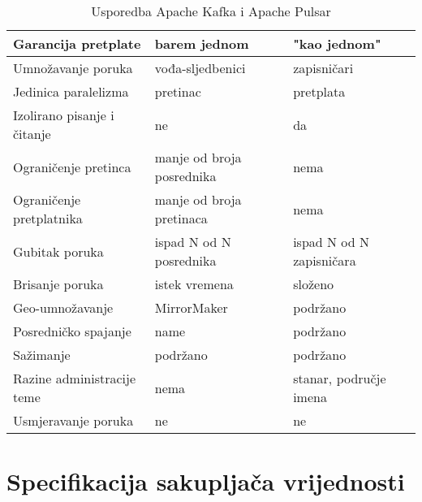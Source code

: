 \documentclass[utf8, diplomski, lmodern, numeric]{fer}
\begin{document}
\begin{table}[H]
\begin{adjustwidth}{-15mm}{15mm}
\begin{tabular}{|l|l|l|}
Garancija pretplate         & barem jednom                  & "kao jednom"                                   \\ \hline
Umnožavanje poruka          & vođa-sljedbenici              & zapisničari                                    \\ \hline
Jedinica paralelizma        & pretinac                      & pretplata                                      \\ \hline
Izolirano pisanje i čitanje & ne                            & da                                             \\ \hline
Ograničenje pretinca        & manje od broja posrednika     & nema                                           \\ \hline
Ograničenje pretplatnika    & manje od broja pretinaca      & nema                                           \\ \hline
Gubitak poruka              & ispad N od N posrednika       & ispad N od N zapisničara                       \\ \hline
Brisanje poruka             & istek vremena                 & složeno                                        \\ \hline
Geo-umnožavanje             & MirrorMaker                   & podržano                                       \\ \hline
Posredničko spajanje        & name                          & podržano                                       \\ \hline
Sažimanje                   & podržano                      & podržano                                       \\ \hline
Razine administracije teme  & nema                          & stanar, područje imena                         \\ \hline
Usmjeravanje poruka         & ne                            & ne                                             \\ \hline
\end{tabular}

\end{adjustwidth}
 
\caption{Usporedba Apache Kafka i Apache Pulsar}
\label{table:kafka_pulsar}

\end{table}



\chapter{Specifikacija sakupljača vrijednosti}
\end{document}
